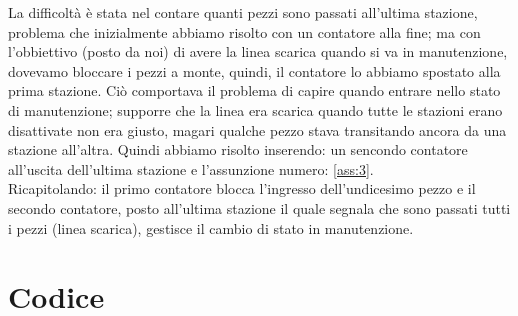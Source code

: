 \documentclass{article}
\begin{document}
La difficoltà è stata nel contare quanti pezzi sono passati all'ultima stazione, problema che inizialmente abbiamo risolto con un contatore alla fine; ma con l'obbiettivo (posto da noi) di avere la linea scarica quando si va in manutenzione, dovevamo bloccare i pezzi a monte, quindi, il contatore lo abbiamo spostato alla prima stazione. Ciò comportava il problema di capire quando entrare nello stato di manutenzione; supporre che la linea era scarica quando tutte le stazioni erano disattivate non era giusto, magari qualche pezzo stava transitando ancora da una stazione all'altra. Quindi abbiamo risolto inserendo: un sencondo contatore all'uscita dell'ultima stazione e l'assunzione numero: \ref{ass:3}.
\\

Ricapitolando: il primo contatore blocca l'ingresso dell'undicesimo pezzo e il secondo contatore, posto all'ultima stazione il quale segnala che sono passati tutti i pezzi (linea scarica), gestisce il cambio di stato in manutenzione.


\section{Codice}

\label{sec:codice_main}


\label{sec:codice_funzione}
\end{document}
